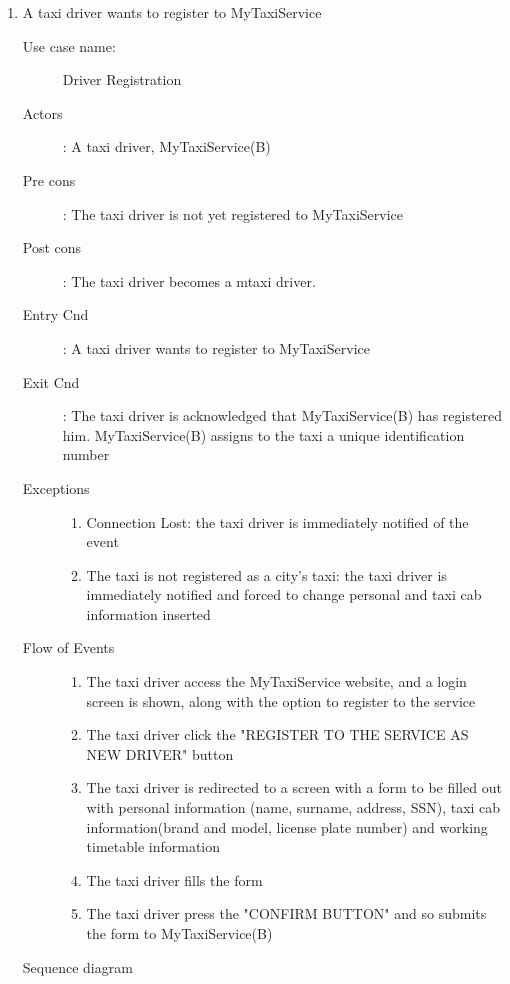 \documentclass[11pt]{article} %
\begin{document}
\begin{enumerate}
	
	      \item A taxi driver wants to register to MyTaxiService
		\begin{description}
		        \item [Use case name:] Driver Registration
		        \item [Actors]: A taxi driver, MyTaxiService(B)
		        \item [Pre cons]: The taxi driver is not yet registered to MyTaxiService
		        \item [Post cons]: The taxi driver becomes a mtaxi driver.
		        \item [Entry Cnd]: A taxi driver wants to register to MyTaxiService
		        \item [Exit Cnd]: The taxi driver is acknowledged that MyTaxiService(B) has registered him. MyTaxiService(B)
		        assigns to the taxi a unique identification number
		        \item [Exceptions] \hfill
			\begin{enumerate}
			          \item Connection Lost: the taxi driver is immediately notified of the event
			          \item The taxi is not registered as a city's taxi: the taxi driver is immediately notified
			          and forced to change personal and taxi cab information inserted
			\end{enumerate}
		        \item [Flow of Events]\hfill
			\begin{enumerate}
			          \item The taxi driver access the MyTaxiService website, and a login
			            screen is shown, along with the option to register to the service
			          \item The taxi driver click the "REGISTER TO THE SERVICE AS NEW DRIVER" button
			          \item The taxi driver is redirected to a screen with a form to be filled out with personal information (name, surname, address, SSN),
			           taxi cab information(brand and model, license plate number) and working timetable information
			          \item The taxi driver fills the form
			          \item The taxi driver press the "CONFIRM BUTTON" and so submits the form to MyTaxiService(B)
			\end{enumerate}
		\end{description}
		Sequence diagram

\end{enumerate}
\end{document}
